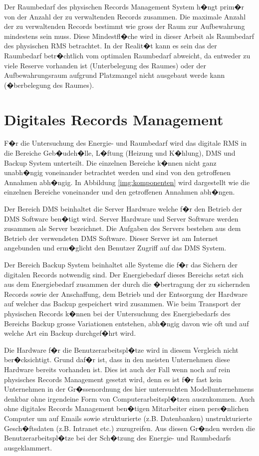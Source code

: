 \documentclass[a4paper,twoside,10pt]{report}
\begin{document}
Der Raumbedarf des physischen Records Management System h�ngt prim�r von der Anzahl der zu verwaltenden Records zusammen. Die maximale Anzahl der zu verwaltenden Records bestimmt wie gross der Raum zur Aufbewahrung mindestens sein muss. Diese Mindestfl�che wird in dieser Arbeit als Raumbedarf des physischen \ac{RMS} betrachtet. In der Realit�t kann es sein das der Raumbedarf betr�chtlich vom optimalen Raumbedarf abweicht, da entweder zu viele Reserve vorhanden ist (Unterbelegung des Raumes) oder der Aufbewahrungsraum aufgrund Platzmangel nicht ausgebaut werde kann (�berbelegung des Raumes).

\section{Digitales Records Management}\label{sec:digitale}
F�r die Untersuchung des Energie- und Raumbedarf wird das digitale \ac{RMS} in die Bereiche Geb�udeh�lle, L�ftung (Heizung und K�hlung), \ac{DMS} und Backup System unterteilt. Die einzelnen Bereiche k�nnen nicht ganz unabh�ngig voneinander betrachtet werden und sind von den getroffenen Annahmen abh�ngig. In Abbildung \ref{img:komponenten} wird dargestellt wie die einzelnen Bereiche voneinander und den getroffenen Annahmen abh�ngen.

Der Bereich DMS beinhaltet die Server Hardware welche f�r den Betrieb der \ac{DMS} Software ben�tigt wird. Server Hardware und Server Software werden zusammen als Server bezeichnet. Die Aufgaben des Servers bestehen aus dem Betrieb der verwendeten \ac{DMS} Software. Dieser Server ist am Internet angebunden und erm�glicht den Benutzer Zugriff auf das \ac{DMS} System.

Der Bereich Backup System beinhaltet alle Systeme die f�r das Sichern der digitalen Records notwendig sind. Der Energiebedarf dieses Bereichs setzt sich aus dem Energiebedarf zusammen der durch die �bertragung der zu sichernden Records sowie der Anschaffung, dem Betrieb und der Entsorgung der Hardware auf welcher das Backup gespeichert wird zusammen. Wie beim Transport der physischen Records k�nnen bei der Untersuchung des Energiebedarfs des Bereichs Backup grosse Variationen entstehen, abh�ngig davon wie oft und auf welche Art ein Backup durchgef�hrt wird. 

Die Hardware f�r die Benutzerarbeitspl�tze wird in diesem Vergleich nicht ber�cksichtigt. Grund daf�r ist, dass in den meisten Unternehmen diese Hardware bereits vorhanden ist. Dies ist auch der Fall wenn noch auf rein physisches Records Management gesetzt wird, denn es ist f�r fast kein Unternehmen in der Gr�ssenordnung des hier untersuchten Modellunternehmens denkbar ohne irgendeine Form von Computerarbeitspl�tzen auszukommen. Auch ohne digitales Records Management ben�tigen Mitarbeiter einen pers�nlichen Computer um auf Emails sowie strukturierte (z.B. Datenbanken) unstrukturierte Gesch�ftsdaten (z.B. Intranet etc.) zuzugreifen. Aus diesen Gr�nden werden die Benutzerarbeitspl�tze bei der Sch�tzung des Energie- und Raumbedarfs ausgeklammert. 
\end{document}
